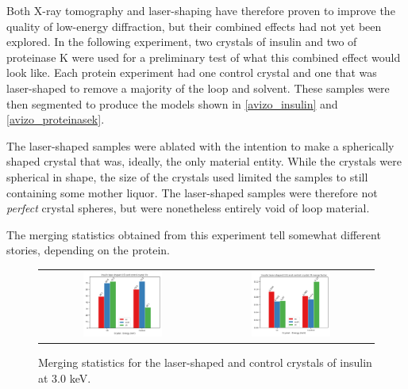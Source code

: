 Both X-ray tomography and laser-shaping have therefore proven to improve the quality of low-energy diffraction, but their combined effects had not yet been explored. In the following experiment, two crystals of insulin and two of proteinase K were used for a preliminary test of what this combined effect would look like. Each protein experiment had one control crystal and one that was laser-shaped to remove a majority of the loop and solvent. These samples were then segmented to produce the models shown in \cref{avizo_insulin} and \cref{avizo_proteinasek}.

The laser-shaped samples were ablated with the intention to make a spherically shaped crystal that was, ideally, the only material entity. While the crystals were spherical in shape, the size of the crystals used limited the samples to still containing some mother liquor. The laser-shaped samples were therefore not \textit{perfect} crystal spheres, but were nonetheless entirely void of loop material.

The merging statistics obtained from this experiment tell somewhat different stories, depending on the protein. 

\begin{figure}[h]
    \centering
    \begin{tabular}{cc}
    \includegraphics[width = 0.5\textwidth]{plots/exp2/ins_I_over_sigma.png} & \includegraphics[width = 0.5\textwidth]{plots/exp2/ins_rmerges.png}
    \end{tabular}
    \caption{Merging statistics for the laser-shaped and control crystals of insulin at 3.0 \unit{keV}.}
    \label{fig:insulin}
\end{figure}


